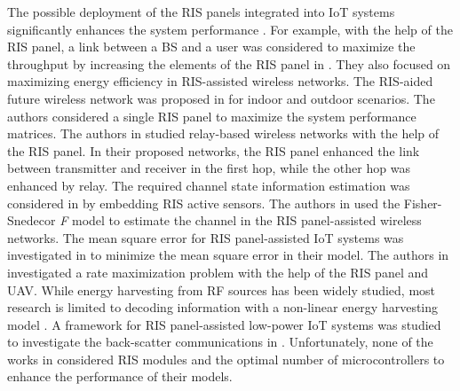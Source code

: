 The possible deployment of the RIS panels integrated into IoT systems significantly enhances the system performance \cite{Ref_RW_13,Ref_RW_14,Ref_RW_15,Ref_RW_1..,Ref_RW_17,Ref_RW_18,Ref_RW_7,Ref_RW_8,Ref_RW_20,Ref_RW_19}.
For example, with the help of the RIS panel, a link between a BS and a user was considered to maximize the throughput by increasing the elements of the RIS panel in \cite{Ref_RW_13}.
They also focused on maximizing energy efficiency in RIS-assisted wireless networks.
The RIS-aided future wireless network was proposed in \cite{Ref_RW_14} for indoor and outdoor scenarios.
The authors considered a single RIS panel to maximize the system performance matrices.
The authors in \cite{Ref_RW_15} studied relay-based wireless networks with the help of the RIS panel.
In their proposed networks, the RIS panel enhanced the link between transmitter and receiver in the first hop, while the other hop was enhanced by relay.
The required channel state information estimation was considered in \cite{Ref_RW_1..} by embedding RIS active sensors.
The authors in \cite{Ref_RW_17} used the Fisher-Snedecor \textit{F} model to estimate the channel in the RIS panel-assisted wireless networks.
The mean square error for RIS panel-assisted IoT systems was investigated in \cite{Ref_RW_18} to minimize the mean square error in their model.
The authors in \cite{Ref_RW_20} investigated a rate maximization problem with the help of the RIS panel and UAV.
While energy harvesting from RF sources has been widely studied, most research is limited to decoding information with a non-linear energy harvesting model \cite{Ref_RW_7, Ref_RW_8}.
A framework for RIS panel-assisted low-power IoT systems was studied to investigate the back-scatter communications in \cite{Ref_RW_19}.
Unfortunately, none of the works in \cite{Ref_RW_1,Ref_RW_2,Ref_RW_3,Ref_RW_5,Ref_RW_6,Ref_RW_9,Ref_RW_11,Ref_RIS14,Ref_RW_13,Ref_RW_14,Ref_RW_15,Ref_RW_1..,Ref_RW_17,Ref_RW_18,Ref_RW_7,Ref_RW_8,Ref_RW_20,Ref_RW_19} considered RIS modules and the optimal number of microcontrollers to enhance the performance of their models.